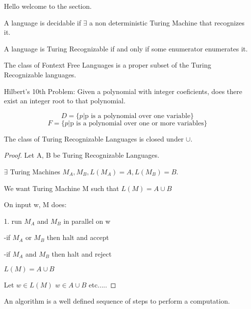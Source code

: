 
Hello welcome to the section.

\begin{corollary}
    A language is decidable if $\exists$ a non deterministic Turing Machine that recognizes it.
\end{corollary}

\begin{theorem}
    A language is Turing Recognizable if and only if some enumerator enumerates it.
\end{theorem}

\begin{theorem}
    The class of Fontext Free Languages is a proper subset of the Turing Recognizable languages.
\end{theorem}

Hilbert's 10th Problem: Given a polynomial with integer coeficients, does there exist an integer root to that polynomial.

\[D = \{p|\text{p is a polynomial over one variable}\}  \]
\[F = \{p|\text{p is a polynomial over one or more variables}\}  \]

\begin{theorem}
The class of Turing Recognizable Languages is closed under $\cup$.
\end{theorem}

\begin{proof}
    Let A, B be Turing Recognizable Languages.

    $\exists$ Turing Machines $M_A, M_B, L(M_A)=A, L(M_B)=B$.

    We want Turing Machine M such that $L(M)=A\cup B$

    On input w, M does:

    1. run $M_A$ and $M_B$ in parallel on w

        -if $M_A$ or $M_B$ then halt and accept
        
        -if $M_A$ and $M_B$ then halt and reject

    \begin{claim}
        $L(M)=A\cup B$
    \end{claim}
    Let $w\in L(M)$
    $w\in A\cup B$ etc.....
\end{proof}






\pagebreak





\begin{definition}
    An algorithm is a well defined sequence of steps to perform a computation.
\end{definition}


